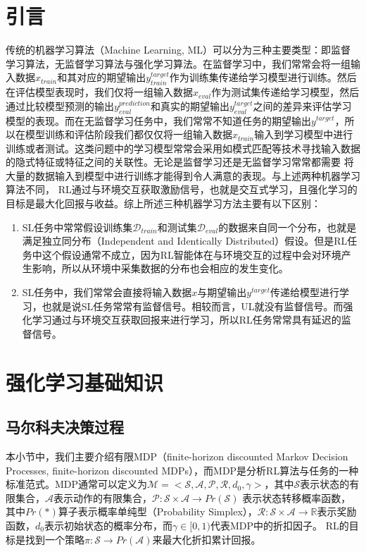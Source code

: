 \section{引言}
传统的机器学习算法（Machine Learning, ML）可以分为三种主要类型：即监督学习算法，无监督学习算法与强化学习算法。在监督学习中，我们常常会将一组输入数据$x_{train}$和其对应的期望输出$y_{train}^{target}$作为训练集传递给学习模型进行训练。然后在评估模型表现时，我们仅将一组输入数据$x_{eval}$作为测试集传递给学习模型，然后通过比较模型预测的输出$y_{eval}^{prediction}$和真实的期望输出$y_{eval}^{target}$之间的差异来评估学习模型的表现。而在无监督学习任务中，我们常常不知道任务的期望输出$y^{target}$，所以在模型训练和评估阶段我们都仅仅将一组输入数据$x_{train}$输入到学习模型中进行训练或者测试。这类问题中的学习模型常常会采用如模式匹配等技术寻找输入数据的隐式特征或特征之间的关联性。无论是监督学习还是无监督学习常常都需要
将大量的数据输入到模型中进行训练才能得到令人满意的表现。与上述两种机器学习算法不同，
RL通过与环境交互获取激励信号，也就是交互式学习，且强化学习的目标是最大化回报与收益。综上所述三种机器学习方法主要有以下区别：
\begin{enumerate}
    \item SL任务中常常假设训练集$\mathcal{D}_{train}$和测试集$\mathcal{D}_{eval}$的数据来自同一个分布，也就是满足独立同分布（Independent and Identically Distributed）假设。但是RL任务中这个假设通常不成立，因为RL智能体在与环境交互的过程中会对环境产生影响，所以从环境中采集数据的分布也会相应的发生变化。
    \item SL任务中，我们常常会直接将输入数据$x$与期望输出$y^{target}$传递给模型进行学习，也就是说SL任务常常有监督信号。相较而言，UL就没有监督信号。而强化学习通过与环境交互获取回报来进行学习，所以RL任务常常具有延迟的监督信号。
\end{enumerate}

\section{强化学习基础知识}
\subsection{马尔科夫决策过程}
\label{sec: MDP}

本小节中，我们主要介绍有限MDP（finite-horizon discounted Markov Decision Processes, finite-horizon discounted MDPs），而MDP是分析RL算法与任务的一种标准范式。MDP通常可以定义为$\mathcal{M} =<\mathcal{S},\mathcal{A},\mathcal{P},\mathcal{R},d_0,\gamma> $，其中$\mathcal{S}$表示状态的有限集合，$\mathcal{A}$表示动作的有限集合，$\mathcal{P}:\mathcal{S}\times\mathcal{A}\rightarrow Pr(\mathcal{S})$ 表示状态转移概率函数，其中$Pr(*)$算子表示概率单纯型（Probability Simplex），$\mathcal{R}:\mathcal{S}\times\mathcal{A}\rightarrow\mathbb{R}$表示奖励函数，$d_0$表示初始状态的概率分布，而$\gamma\in[0,1)$代表MDP中的折扣因子。
RL的目标是找到一个策略$\pi:\mathcal{S}\rightarrow Pr(\mathcal{A})$来最大化折扣累计回报。

